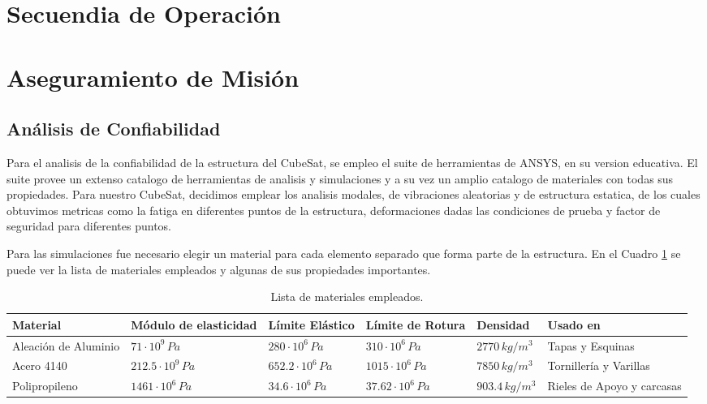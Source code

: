 \section{Secuendia de Operación}

\section{Aseguramiento de Misión}

  \subsection{Análisis de Confiabilidad}
    Para el analisis de la confiabilidad de la estructura del CubeSat, se empleo el suite de
    herramientas de ANSYS, en su version educativa. El suite provee un extenso catalogo de
    herramientas de analisis y simulaciones y a su vez un amplio catalogo de materiales con
    todas sus propiedades. Para nuestro CubeSat, decidimos emplear los analisis modales, de
    vibraciones aleatorias y de estructura estatica, de los cuales obtuvimos metricas como la
    fatiga en diferentes puntos de la estructura, deformaciones dadas las condiciones de prueba
    y factor de seguridad para diferentes puntos.

    Para las simulaciones fue necesario elegir un material para cada elemento separado que
    forma parte de la estructura. En el Cuadro \ref{tab:materiales_empleados} se puede ver la
    lista de materiales empleados y algunas de sus propiedades importantes.

    \begin{table}[H]
    \centering
    \small
    \begin{tabular}{|p{2.2cm}|p{2.3cm}|p{2.3cm}|p{2.5cm}|p{2cm}|p{2.5cm}|}
    \hline
    \textbf{Material} & \centering\textbf{Módulo de elasticidad} & \centering\textbf{Límite Elástico} & \centering\textbf{Límite de Rotura} & \centering\textbf{Densidad} & \centering\textbf{Usado en} \tabularnewline
    \hline
    Aleación de Aluminio & \centering $71 \cdot 10^9\,Pa$ & \centering $280 \cdot 10^6\,Pa$ & \centering $310 \cdot 10^6\,Pa$ & \centering $2770\,kg/m^3$ & Tapas y Esquinas \tabularnewline
    \hline
    Acero 4140 & \centering $212.5 \cdot 10^9\,Pa$ & \centering $652.2 \cdot 10^6\,Pa$ & \centering $1015 \cdot 10^6\,Pa$ & \centering $7850\,kg/m^3$ & Tornillería y Varillas \tabularnewline
    \hline
    Polipropileno & \centering $1461 \cdot 10^6\,Pa$ & \centering $34.6 \cdot 10^6\,Pa$ & \centering $37.62 \cdot 10^6\,Pa$ & \centering $903.4\,kg/m^3$ & Rieles de Apoyo y carcasas \tabularnewline
    \hline
    \end{tabular}
    \caption{Lista de materiales empleados.}
    \label{tab:materiales_empleados}
    \end{table}


